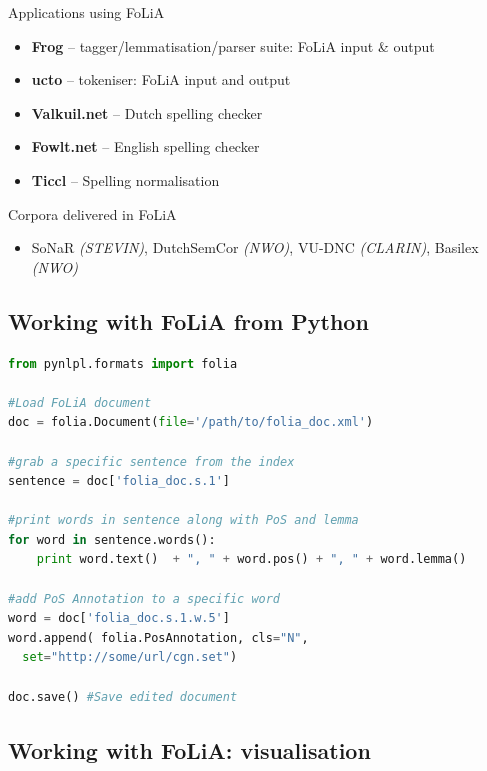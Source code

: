 \documentclass[compress]{beamer}
\begin{document}
\begin{frame}
	\begin{block}{Applications using FoLiA}
		\begin{itemize}
			\item \textbf{Frog} -- tagger/lemmatisation/parser suite: FoLiA input \& output
			\item \textbf{ucto} -- tokeniser: FoLiA input and output
			\item \textbf{Valkuil.net} -- Dutch spelling checker
			\item \textbf{Fowlt.net} -- English spelling checker
			\item \textbf{Ticcl} -- Spelling normalisation
		\end{itemize}
	\end{block}

	\begin{block}{Corpora delivered in FoLiA}
		\begin{itemize}
			\item SoNaR \emph{(STEVIN)}, DutchSemCor \emph{(NWO)}, VU-DNC \emph{(CLARIN)}, Basilex \emph{(NWO)}
		\end{itemize}
	\end{block}		
\end{frame}
	

\subsection{Working with FoLiA from Python}

\begin{frame}[fragile]
\footnotesize
\begin{lstlisting}[language=python]
from pynlpl.formats import folia

#Load FoLiA document
doc = folia.Document(file='/path/to/folia_doc.xml')

#grab a specific sentence from the index
sentence = doc['folia_doc.s.1']

#print words in sentence along with PoS and lemma
for word in sentence.words():
    print word.text()  + ", " + word.pos() + ", " + word.lemma()	

#add PoS Annotation to a specific word
word = doc['folia_doc.s.1.w.5']
word.append( folia.PosAnnotation, cls="N",
  set="http://some/url/cgn.set")

doc.save() #Save edited document
\end{lstlisting}
\end{frame}


\subsection{Working with FoLiA: visualisation}
\end{document}
